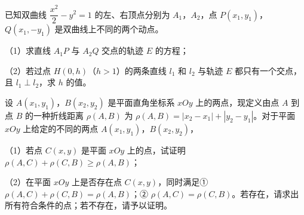 \begin{question}
已知双曲线 $\dfrac{x^2}{2}-y^2=1$ 的左、右顶点分别为 $A_1$，$A_2$，点 $P(x_1,y_1)$，$Q(x_1,-y_1)$ 是双曲线上不同的两个动点。

（1）求直线 $A_1P$ 与 $A_2Q$ 交点的轨迹 $E$ 的方程；

（2）若过点 $H(0,h)$（$h>1$）的两条直线 $l_1$ 和 $l_2$ 与轨迹 $E$ 都只有一个交点，且 $l_1\perp l_2$，求 $h$ 的值。

\end{question}
\begin{question}
设 $A(x_1,y_1)$，$B(x_2,y_2)$ 是平面直角坐标系 $xOy$ 上的两点，现定义由点 $A$ 到点 $B$ 的一种折线距离 $\rho(A,B)$ 为 $\rho(A,B)=|x_2-x_1|+|y_2-y_1|$。对于平面 $xOy$ 上给定的不同的两点 $A(x_1,y_1)$，$B(x_2,y_2)$，

（1）若点 $C(x,y)$ 是平面 $xOy$ 上的点，试证明 $\rho(A,C)+\rho(C,B)\geqslant\rho(A,B)$；

（2）在平面 $xOy$ 上是否存在点 $C(x,y)$，同时满足① $\rho(A,C)+\rho(C,B)=\rho(A,B)$；② $\rho(A,C)=\rho(C,B)$。若存在，请求出所有符合条件的点；若不存在，请予以证明。

\end{question}